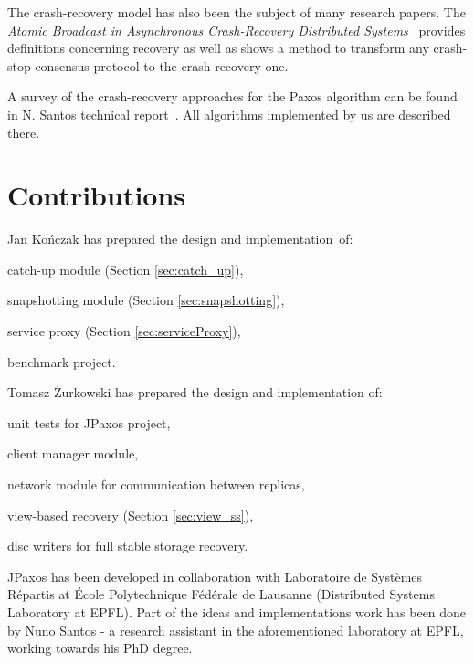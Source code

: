 The crash-recovery model has also been the subject of many research papers. \linebreak The \textit{Atomic Broadcast in Asynchronous Crash-Recovery Distributed Systems}~\cite{rodriguez2000atomic} provides definitions concerning recovery as well as shows a method to transform any crash-stop consensus protocol to the crash-recovery one.

A survey of the crash-recovery approaches for the Paxos algorithm can be found in N. Santos technical report~\cite{Nun10}. All algorithms implemented by us are described there.

\section{Contributions}

Jan Kończak has prepared the design and implementation~of:
\begin{tightList}
  \item[\textbullet] catch-up module (Section \ref{sec:catch_up}),
  \item[\textbullet] snapshotting module (Section \ref{sec:snapshotting}),
  \item[\textbullet] service proxy  (Section \ref{sec:serviceProxy}),
  \item[\textbullet] benchmark project.
\end{tightList}

\noindent Tomasz Żurkowski has prepared the design and implementation of:
\begin{tightList}
  \item[\textbullet] unit tests for JPaxos project,
  \item[\textbullet] client manager module, 
  \item[\textbullet] network module for communication between replicas,
  \item[\textbullet] view-based recovery (Section \ref{sec:view_ss}),
  \item[\textbullet] disc writers for full stable storage recovery.
\end{tightList}

\noindent JPaxos has been developed in collaboration with Laboratoire de Systèmes Répartis at École Polytechnique Fédérale de Lausanne (Distributed Systems Laboratory at EPFL). Part of the ideas and implementations work has been done by Nuno Santos - a research assistant in the aforementioned laboratory at EPFL, working towards his PhD degree.

